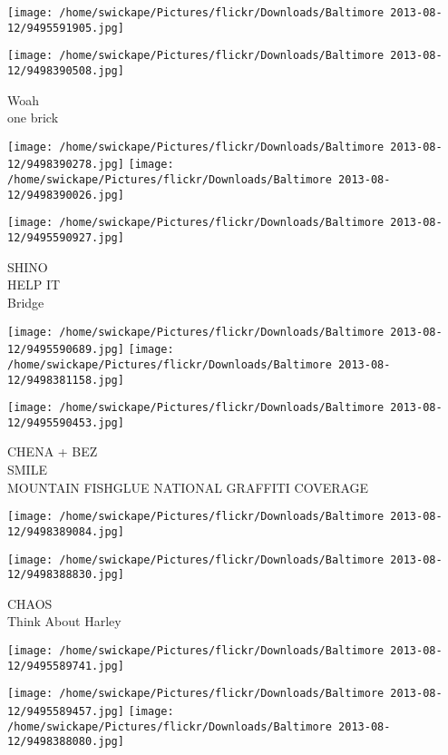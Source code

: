 \documentclass[10pt,letterpaper]{article}
\begin{document}
\texttt{[image: /home/swickape/Pictures/flickr/Downloads/Baltimore 2013-08-12/9495591905.jpg]}

\vspace{0.25in}
\texttt{[image: /home/swickape/Pictures/flickr/Downloads/Baltimore 2013-08-12/9498390508.jpg]}

Woah\\
one brick\\
\pagebreak

\texttt{[image: /home/swickape/Pictures/flickr/Downloads/Baltimore 2013-08-12/9498390278.jpg]}
\texttt{[image: /home/swickape/Pictures/flickr/Downloads/Baltimore 2013-08-12/9498390026.jpg]}

\vspace{0.25in}
\texttt{[image: /home/swickape/Pictures/flickr/Downloads/Baltimore 2013-08-12/9495590927.jpg]}

SHINO\\
HELP IT\\
Bridge\\
\pagebreak

\texttt{[image: /home/swickape/Pictures/flickr/Downloads/Baltimore 2013-08-12/9495590689.jpg]}
\texttt{[image: /home/swickape/Pictures/flickr/Downloads/Baltimore 2013-08-12/9498381158.jpg]}

\texttt{[image: /home/swickape/Pictures/flickr/Downloads/Baltimore 2013-08-12/9495590453.jpg]}

CHENA + BEZ\\
SMILE\\
MOUNTAIN FISHGLUE NATIONAL GRAFFITI COVERAGE\\
\pagebreak

\texttt{[image: /home/swickape/Pictures/flickr/Downloads/Baltimore 2013-08-12/9498389084.jpg]}

\vspace{0.25in}
\texttt{[image: /home/swickape/Pictures/flickr/Downloads/Baltimore 2013-08-12/9498388830.jpg]}

CHAOS\\
Think About Harley\\
\pagebreak

\texttt{[image: /home/swickape/Pictures/flickr/Downloads/Baltimore 2013-08-12/9495589741.jpg]}

\vspace{0.25in}
\texttt{[image: /home/swickape/Pictures/flickr/Downloads/Baltimore 2013-08-12/9495589457.jpg]}
\texttt{[image: /home/swickape/Pictures/flickr/Downloads/Baltimore 2013-08-12/9498388080.jpg]}
\end{document}

